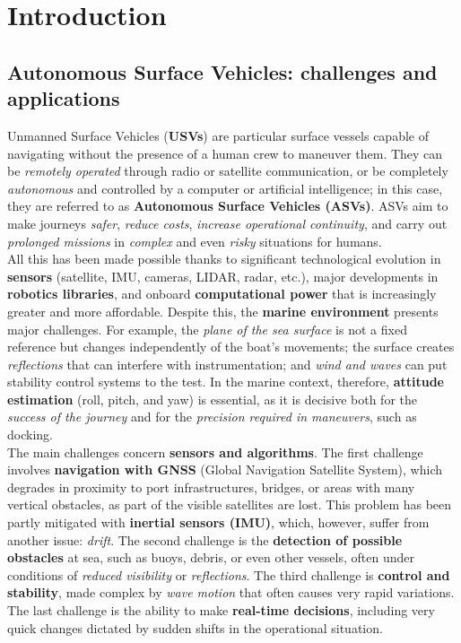 \chapter{Introduction}
\thispagestyle{empty}
\section{Autonomous Surface Vehicles: challenges and applications}
Unmanned Surface Vehicles (\textbf{USVs}) are particular surface vessels capable of navigating without the presence of a human crew to maneuver them. They can be \textit{remotely operated} through radio or satellite communication, or be completely \textit{autonomous} and controlled by a computer or artificial intelligence; in this case, they are referred to as \textbf{Autonomous Surface Vehicles (ASVs)}. ASVs aim to make journeys \textit{safer}, \textit{reduce costs}, \textit{increase operational continuity}, and carry out \textit{prolonged missions} in \textit{complex} and even \textit{risky} situations for humans.\\

All this has been made possible thanks to significant technological evolution in \textbf{sensors} (satellite, IMU, cameras, LIDAR, radar, etc.), major developments in \textbf{robotics libraries}, and onboard \textbf{computational power} that is increasingly greater and more affordable. Despite this, the \textbf{marine environment} presents major challenges. For example, the \textit{plane of the sea surface} is not a fixed reference but changes independently of the boat’s movements; the surface creates \textit{reflections} that can interfere with instrumentation; and \textit{wind and waves} can put stability control systems to the test. In the marine context, therefore, \textbf{attitude estimation} (roll, pitch, and yaw) is essential, as it is decisive both for the \textit{success of the journey} and for the \textit{precision required in maneuvers}, such as docking.\\

The main challenges concern \textbf{sensors and algorithms}. The first challenge involves \textbf{navigation with GNSS} (Global Navigation Satellite System), which degrades in proximity to port infrastructures, bridges, or areas with many vertical obstacles, as part of the visible satellites are lost. This problem has been partly mitigated with \textbf{inertial sensors (IMU)}, which, however, suffer from another issue: \textit{drift}. The second challenge is the \textbf{detection of possible obstacles} at sea, such as buoys, debris, or even other vessels, often under conditions of \textit{reduced visibility} or \textit{reflections}. The third challenge is \textbf{control and stability}, made complex by \textit{wave motion} that often causes very rapid variations. The last challenge is the ability to make \textbf{real-time decisions}, including very quick changes dictated by sudden shifts in the operational situation.\\

